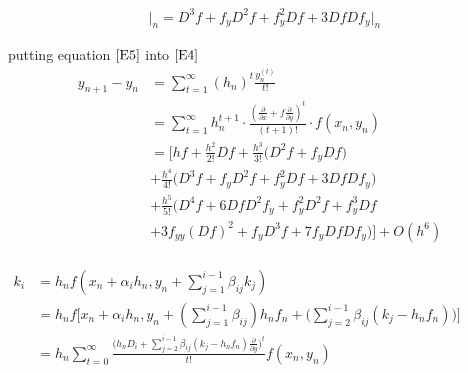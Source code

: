 \documentclass[12 pt]{article}
\begin{document}
{
\Large
\begin{equation*}
\frac{\mathop{\mathrm{d^{3}f}}}{\mathop{\mathrm{dx^{3}}}}\Big\vert_{n} = D^{3}f + f_{y}D^{2}f + f_{y}^{2}Df + 3DfDf_{y}\Big\vert_{n}
\end{equation*}
}

putting equation $\ref{E5}$ into $\ref{E4}$ 
{
\large
\begin{equation}\label{E6}
\begin{split}
y_{n+1}-y_{n} &= \sum_{t = 1}^{\infty}(h_{n})^{t}\frac{y_{n}^{(t)}}{t!}\\
			  &= \sum_{t = 1}^{\infty}h_{n}^{t+1}\cdot \frac{(\frac{\partial }{\partial x} +f\frac{\partial }{\partial y})^{t}}{(t+1)!}\cdot f(x_{n},y_{n})\\
			  &=\bigg[hf + \frac{h^{2}}{2!}Df + \frac{h^{3}}{3!}\bigg(D^{2}f+f_{y}Df\bigg)  \\
			  & + \frac{h^{4}}{4!}\bigg(D^{3}f + f_{y}D^{2}f + f_{y}^{2}Df + 3DfDf_{y}\bigg) \\
			  & + \frac{h^{5}}{5!}\bigg(D^{4}f+6DfD^{2}f_{y} + f_{y}^{2}D^{2}f + f_{y}^{3}Df \\
			  & + 3f_{yy}(Df)^{2} + f_{y}D^{3}f + 7f_{y}DfDf_{y}\bigg)\bigg] + O(h^{6})\\
\end{split}
\end{equation}
}

{
	\large
	\begin{align*}
		k_{i} &= h_{n}f(x_{n}+\alpha_{i}h_{n}, y_{n}+\sum_{j=1}^{i-1}\beta_{ij}k_{j}) &   &   &   &    &     &	&	 & 	&\\
		&= h_{n}f\bigg[x_{n}+\alpha_{i}h_{n}, y_{n}+(\sum_{j=1}^{i-1}\beta_{ij})h_{n}f_{n} + \bigg(\sum_{j=2}^{i-1}\beta_{ij}(k_{j}-h_{n}f_{n})\bigg)\bigg] &    &     &     &	  &		&   &    &	  &\\
		&= h_{n}\sum_{t=0}^{\infty}\frac{\bigg(h_{n}D_{i}+\sum_{j=2}^{i-1}\beta_{ij}(k_{j}-h_{n}f_{n})\frac{\partial}{\partial y}\bigg)^{t}}{t!}f(x_{n},y_{n}) &    &     &	 &		&	   &    &	  &     &\\
	\end{align*}
}
\end{document}
